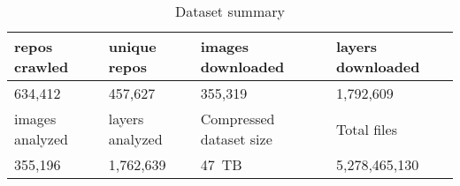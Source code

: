 
\begin{table}
	\scriptsize
	\caption{Dataset summary} \label{tab-dataset-summary}
	\begin{tabular}{|p{}|p{}|p{}|p{}|}%
		\hline
		repos crawled & unique repos & images downloaded  & layers downloaded \\
		\hline
		634,412             & 457,627             & 355,319                 & 1,792,609  \\
		\hline
		images analyzed & layers analyzed & Compressed dataset size  &  Total files \\
		\hline
		355,196               & 1,762,639             & 47~TB           & 5,278,465,130  \\
		\hline
	\end{tabular}
\end{table}

